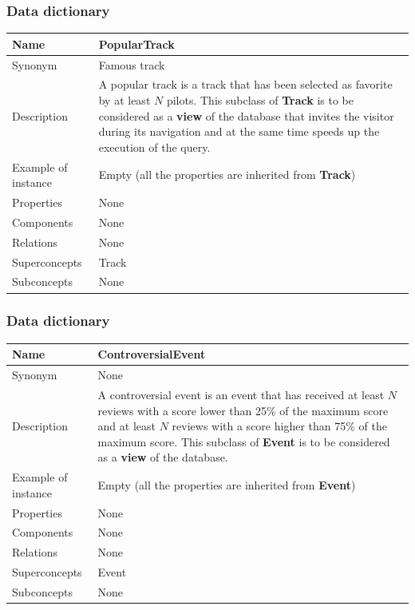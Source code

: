 \documentclass{beamer}
\begin{document}
\begin{frame}
    \frametitle{Data dictionary}
    \begin{table}
    \tiny
    \begin{tabular}{|p{2cm}|p{6cm}|}
    \hline
    Name & \textbf{PopularTrack} \\
    \hline
    Synonym & Famous track \\
    \hline
    Description & A popular track is a track that has been selected as favorite by
    at least $N$ pilots.\newline
    This subclass of \textbf{Track} is to be considered as a \textbf{view} of the database
    that invites the visitor during its navigation and at the same time speeds up the
    execution of the query. \\
    \hline
    Example of instance & Empty (all the properties are inherited from \textbf{Track}) \\
    \hline
    Properties & None \\
    \hline
    Components & None \\
    \hline
    Relations & None \\
    \hline
    Superconcepts & Track \\
    \hline
    Subconcepts & None \\
    \hline
    \end{tabular}
    \end{table}
\end{frame}


\begin{frame}
    \frametitle{Data dictionary}
    \begin{table}
    \tiny
    \begin{tabular}{|p{2cm}|p{6cm}|}
    \hline
    Name & \textbf{ControversialEvent} \\
    \hline
    Synonym & None \\
    \hline
    Description & A controversial event is an event that has received at least $N$ reviews
    with a score lower than 25\% of the maximum score and at least $N$ reviews 
    with a score higher than 75\% of the maximum score.\newline
    This subclass of \textbf{Event} is to be considered as a \textbf{view} of the database. \\
    \hline
    Example of instance & Empty (all the properties are inherited from \textbf{Event}) \\
    \hline
    Properties & None \\
    \hline
    Components & None \\
    \hline
    Relations & None \\
    \hline
    Superconcepts & Event \\
    \hline
    Subconcepts & None \\
    \hline
    \end{tabular}
    \end{table}
\end{frame}
\end{document}
